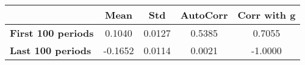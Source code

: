 \begin{tiny}\begin{tabular}{|l|c|c|c|c|}
\hline
&\textbf{Mean}&\textbf{Std}&\textbf{AutoCorr}&\textbf{Corr with g}\\\hline
\textbf{First 100 periods}&0.1040&0.0127&0.5385&0.7055\\\hline
\textbf{Last 100 periods}&-0.1652&0.0114&0.0021&-1.0000\\\hline
\end{tabular}
\end{tiny}